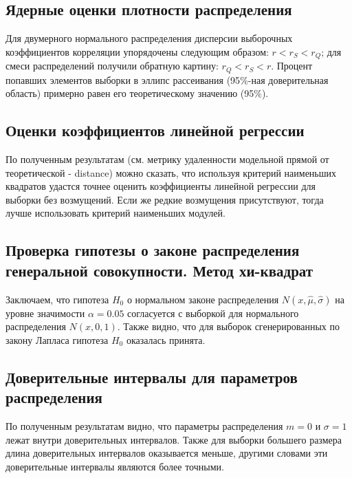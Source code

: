 \subsection{Ядерные оценки плотности распределения}
	Для двумерного нормального распределения дисперсии выборочных коэффициентов корреляции упорядочены следующим образом: $r < r_{S} < r_{Q}$; для смеси распределений получили обратную картину: $r_{Q} < r_{S} < r$.
	\newline
	Процент попавших элементов выборки в эллипс рассеивания (95$\%$-ная доверительная область) примерно равен его теоретическому значению (95$\%$).
	
\subsection{Оценки коэффициентов линейной регрессии}
По полученным результатам (см. метрику удаленности модельной прямой от теоретической - distance) можно сказать, что используя критерий наименьших квадратов удастся точнее оценить коэффициенты линейной регрессии для выборки без возмущений. Если же редкие возмущения присутствуют, тогда лучше использовать критерий наименьших модулей.

\subsection{Проверка гипотезы о законе распределения генеральной совокупности. Метод хи-квадрат}
Заключаем, что гипотеза $H_{0}$ о нормальном законе распределения $N(x,\hat{\mu}, \hat{\sigma})$ на уровне значимости $\alpha = 0.05$ согласуется с выборкой для нормального распределения $N(x, 0, 1)$.
\newline
Также видно, что для выборок сгенерированных по закону Лапласа гипотеза $H_{0}$ оказалась принята.

\subsection{Доверительные интервалы для параметров распределения}
По полученным результатам видно, что параметры распределения $m = 0$ и $\sigma = 1$ лежат внутри доверительных интервалов. Также для выборки большего размера длина доверительных интервалов оказывается меньше, другими словами эти доверительные интервалы являются более точными.